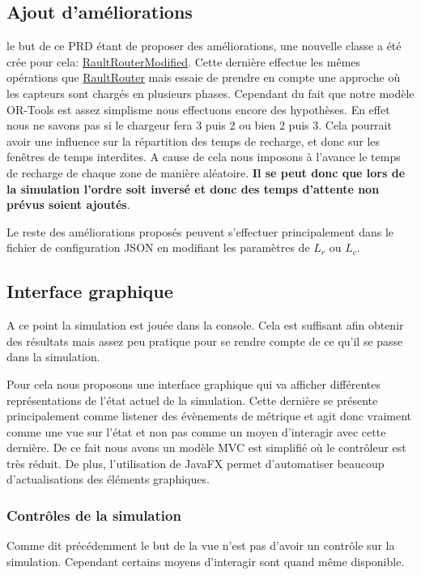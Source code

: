 \documentclass[final]{polytech/polytech}
\newcommand{\klass}[1]{\hyperref[class:#1]{#1}}
\begin{document}
		\subsection{Ajout d'améliorations}
			le but de ce PRD étant de proposer des améliorations, une nouvelle classe a été crée pour cela:
			 \klass{RaultRouterModified}.
			 Cette dernière effectue les mêmes opérations que \klass{RaultRouter} mais essaie de prendre en compte une approche où les capteurs sont chargés en plusieurs phases.
			 Cependant du fait que notre modèle OR-Tools est assez simplisme nous effectuons encore des hypothèses.
			 En effet nous ne savons pas si le chargeur fera 3 puis 2 ou bien 2 puis 3.
			 Cela pourrait avoir une influence sur la répartition des temps de recharge, et donc sur les fenêtres de temps interdites.
			 A cause de cela nous imposons à l'avance le temps de recharge de chaque zone de manière aléatoire.
			 \textbf{Il se peut donc que lors de la simulation l'ordre soit inversé et donc des temps d'attente non prévus soient ajoutés}.
			 
			 Le reste des améliorations proposés peuvent s'effectuer principalement dans le fichier de configuration JSON en modifiant les paramètres de $L_r$ ou $L_c$.
			
		\subsection{Interface graphique}
			A ce point la simulation est jouée dans la console.
			Cela est suffisant afin obtenir des résultats mais assez peu pratique pour se rendre compte de ce qu'il se passe dans la simulation.
			
			Pour cela nous proposons une interface graphique qui va afficher différentes représentations de l'état actuel de la simulation.
			Cette dernière se présente principalement comme listener des évènements de métrique et agit donc vraiment comme une vue sur l'état et non pas comme un moyen d'interagir avec cette dernière.
			De ce fait nous avons un modèle MVC est simplifié où le contrôleur est très réduit.
			De plus, l'utilisation de JavaFX permet d'automatiser beaucoup d'actualisations des éléments graphiques.
			
			\subsubsection{Contrôles de la simulation}
				Comme dit précédemment le but de la vue n'est pas d'avoir un contrôle sur la simulation.
				Cependant certains moyens d'interagir sont quand même disponible.
				
\end{document}
